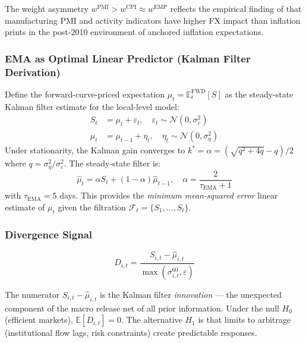 \documentclass[12pt,a4paper]{article}
\begin{document}
The weight asymmetry $w^{\text{PMI}} > w^{\text{CPI}} \approx w^{\text{EMP}}$ reflects the empirical finding of \citet{andersen2003} that manufacturing PMI and activity indicators have higher FX impact than inflation prints in the post-2010 environment of anchored inflation expectations.

\subsubsection{EMA as Optimal Linear Predictor (Kalman Filter Derivation)}

Define the forward-curve-priced expectation $\mu_t = \mathbb{E}^{\text{FWD}}_t[S]$ as the steady-state Kalman filter estimate for the local-level model:
\begin{align}
  S_t &= \mu_t + \varepsilon_t, \quad \varepsilon_t \sim \mathcal{N}(0, \sigma^2_\varepsilon) \label{eq:obs}\\
  \mu_t &= \mu_{t-1} + \eta_t, \quad \eta_t \sim \mathcal{N}(0, \sigma^2_\eta) \label{eq:state}
\end{align}
Under stationarity, the Kalman gain converges to $k^* = \alpha = (\sqrt{q^2 + 4q} - q)/2$ where $q = \sigma^2_\eta/\sigma^2_\varepsilon$. The steady-state filter is:
\begin{equation}
  \hat{\mu}_t = \alpha S_t + (1-\alpha)\hat{\mu}_{t-1}, \quad \alpha = \frac{2}{\tau_{\text{EMA}} + 1}
  \label{eq:ema}
\end{equation}
with $\tau_{\text{EMA}} = 5$ days. This provides the \emph{minimum mean-squared error} linear estimate of $\mu_t$ given the filtration $\mathcal{F}_t = \{S_1, \ldots, S_t\}$.

\subsubsection{Divergence Signal}

\begin{equation}
  D_{i,t} = \frac{S_{i,t} - \hat{\mu}_{i,t}}{\max(\sigma_{i,t}^{60}, \varepsilon)}
  \label{eq:divergence}
\end{equation}

The numerator $S_{i,t} - \hat{\mu}_{i,t}$ is the Kalman filter \emph{innovation} — the unexpected component of the macro release net of all prior information. Under the null $H_0$ (efficient markets), $\mathbb{E}[D_{i,t}] = 0$. The alternative $H_1$ is that limits to arbitrage (institutional flow lags, risk constraints) create predictable responses.
\end{document}
